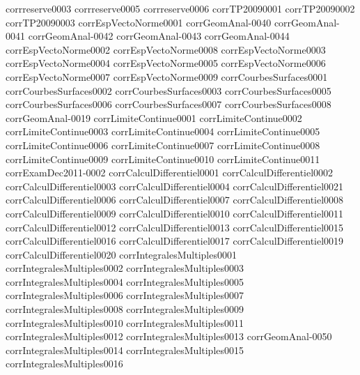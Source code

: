 {corrreserve0003}
{corrreserve0005}
{corrreserve0006}
{corrTP20090001}
{corrTP20090002}
{corrTP20090003}
{corrEspVectoNorme0001}
{corrGeomAnal-0040}
{corrGeomAnal-0041}
{corrGeomAnal-0042}
{corrGeomAnal-0043}
{corrGeomAnal-0044}
{corrEspVectoNorme0002}
{corrEspVectoNorme0008}
{corrEspVectoNorme0003}
{corrEspVectoNorme0004}
{corrEspVectoNorme0005}
{corrEspVectoNorme0006}
{corrEspVectoNorme0007}
{corrEspVectoNorme0009}
{corrCourbesSurfaces0001}
{corrCourbesSurfaces0002}
{corrCourbesSurfaces0003}
{corrCourbesSurfaces0005}
{corrCourbesSurfaces0006}
{corrCourbesSurfaces0007}
{corrCourbesSurfaces0008}
{corrGeomAnal-0019}
{corrLimiteContinue0001}
{corrLimiteContinue0002}
{corrLimiteContinue0003}
{corrLimiteContinue0004}
{corrLimiteContinue0005}
{corrLimiteContinue0006}
{corrLimiteContinue0007}
{corrLimiteContinue0008}
{corrLimiteContinue0009}
{corrLimiteContinue0010}
{corrLimiteContinue0011}
{corrExamDec2011-0002}
{corrCalculDifferentiel0001}
{corrCalculDifferentiel0002}
{corrCalculDifferentiel0003}
{corrCalculDifferentiel0004}
{corrCalculDifferentiel0021}
{corrCalculDifferentiel0006}
{corrCalculDifferentiel0007}
{corrCalculDifferentiel0008}
{corrCalculDifferentiel0009}
{corrCalculDifferentiel0010}
{corrCalculDifferentiel0011}
{corrCalculDifferentiel0012}
{corrCalculDifferentiel0013}
{corrCalculDifferentiel0015}
{corrCalculDifferentiel0016}
{corrCalculDifferentiel0017}
{corrCalculDifferentiel0019}
{corrCalculDifferentiel0020}
{corrIntegralesMultiples0001}
{corrIntegralesMultiples0002}
{corrIntegralesMultiples0003}
{corrIntegralesMultiples0004}
{corrIntegralesMultiples0005}
{corrIntegralesMultiples0006}
{corrIntegralesMultiples0007}
{corrIntegralesMultiples0008}
{corrIntegralesMultiples0009}
{corrIntegralesMultiples0010}
{corrIntegralesMultiples0011}
{corrIntegralesMultiples0012}
{corrIntegralesMultiples0013}
{corrGeomAnal-0050}
{corrIntegralesMultiples0014}
{corrIntegralesMultiples0015}
{corrIntegralesMultiples0016}
